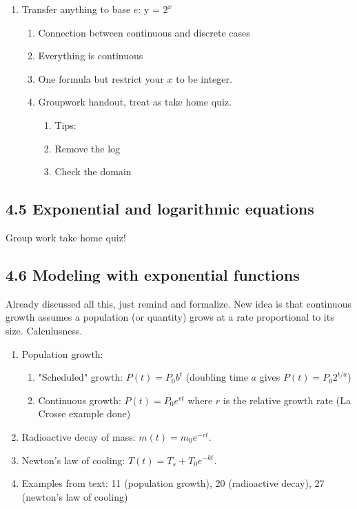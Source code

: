\documentclass{article}
\begin{document}
\begin{enumerate}
\item Transfer anything to base $e$: y = $2^x$
\begin{enumerate}
\item Connection between continuous and discrete cases
\item Everything is continuous
\item One formula but restrict your $x$ to be integer.

\item Groupwork handout, treat as take home quiz.
\begin{enumerate}
\item Tips: 
\item Remove the log
\item Check the domain
\end{enumerate}
\end{enumerate}
\end{enumerate}

\subsection{4.5 Exponential and logarithmic equations}

Group work take home quiz!

\subsection{4.6 Modeling with exponential functions}
Already discussed all this, just remind and formalize. New idea is that continuous growth assumes a population (or quantity) grows at a rate proportional to its size. Calculusness.
\begin{enumerate}
\item Population growth:
\begin{enumerate}
\item "Scheduled" growth: $P(t) = P_0 b^t$ (doubling time $a$ gives $P(t) = P_0 2^{t/a}$)
\item Continuous growth: $P(t) = P_0e^{rt}$ where $r$ is the relative growth rate (La Crosse example done)
\end{enumerate}

\item Radioactive decay of mass: $m(t) = m_0 e^{-rt}$.

\item Newton's law of cooling: $T(t) = T_s + T_0 e^{-kt}$.

\item Examples from text: 11 (population growth), 20 (radioactive decay),  27 (newton's law of cooling)


\end{enumerate}
\end{document}
